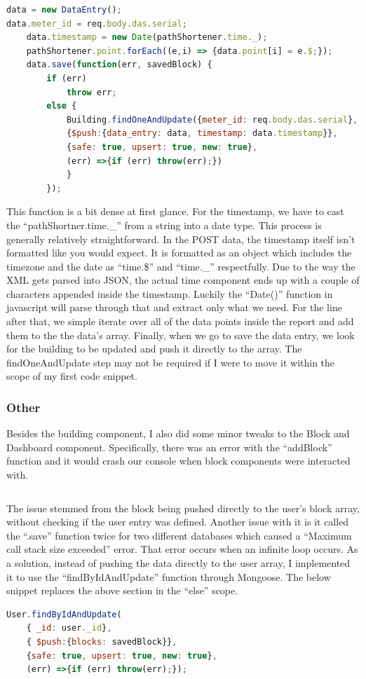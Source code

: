 \documentclass[letterpaper,10pt,serif,draftclsnofoot,onecolumn,compsoc,titlepage]{IEEEtran}
\begin{document}
\begin{lstlisting}[language=JavaScript]
data = new DataEntry();
data.meter_id = req.body.das.serial;
	data.timestamp = new Date(pathShortener.time._);
	pathShortener.point.forEach((e,i) => {data.point[i] = e.$;});
	data.save(function(err, savedBlock) {
		if (err)
			throw err;
		else {
			Building.findOneAndUpdate({meter_id: req.body.das.serial},
			{$push:{data_entry: data, timestamp: data.timestamp}},
			{safe: true, upsert: true, new: true},
			(err) =>{if (err) throw(err);})
            }
        });


\end{lstlisting}

\noindent This function is a bit dense at first glance. For the timestamp, we have to cast the ``pathShortner.time.\_'' from a string into a date type. This process is generally relatively straightforward. In the POST data, the timestamp itself isn't formatted like you would expect. It is formatted as an object which includes the timezone and the date as ``time.\$'' and ``time.\_'' respectfully. Due to the way the XML gets parsed into JSON, the actual time component ends up with a couple of characters appended inside the timestamp. Luckily the ``Date()'' function in javascript will parse through that and extract only what we need. For the line after that, we simple iterate over all of the data points inside the report and add them to the the data's array. Finally, when we go to save the data entry, we look for the building to be updated and push it directly to the array. The findOneAndUpdate step may not be required if I were to move it within the scope of my first code snippet.





\subsubsection{Other}
Besides the building component, I also did some minor tweaks to the Block and Dashboard component. Specifically, there was an error with the ``addBlock'' function and it would crash our console when block components were interacted with. 
\begin{lstlisting}[language=JavaScript]

\end{lstlisting}
\noindent The issue stemmed from the block being pushed directly to the user's block array, without checking if the user entry was defined. Another issue with it is it called the ``.save'' function twice for two different databases which caused a ``Maximum call stack size exceeded'' error. That error occurs when an infinite loop occurs. As a solution, instead of pushing the data directly to the user array, I implemented it to use the ``findByIdAndUpdate'' function through Mongoose. The below snippet replaces the above section in the ``else'' scope.\\
\begin{lstlisting}[language=JavaScript]
User.findByIdAndUpdate(
    { _id: user._id},
    { $push:{blocks: savedBlock}},
    {safe: true, upsert: true, new: true},
    (err) =>{if (err) throw(err);});
\end{lstlisting}
\end{document}
